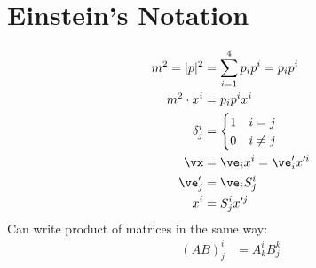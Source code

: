 \documentclass[cplx.tex]{subfiles}
\begin{document}
\section{Einstein's Notation}
\begin{align} 
    m^2 = |p|^2 &= \sum_{i=1}^4 p_ip^i = p_ip^i \\
    m^2\cdot x^i &= p_ip^i x^i \\
    \delta^i_j &= \begin{cases} 1 & i = j \\ 0 & i \neq j\end{cases} \\
    \vx &= \ve_i x^i = \ve'_i x'^i \\
    \ve'_j &= \ve_i S^i_j \\
    x^i &= S^i_j x'^j
\end{align}
Can write product of matrices in the same way:
\begin{align}
    (AB)^i_j &= A^i_kB^k_j
\end{align}
\end{document}

